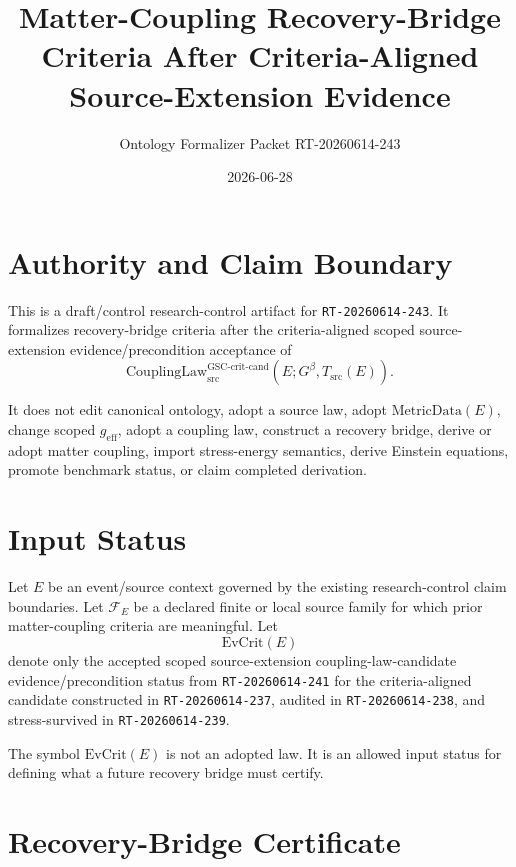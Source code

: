 \documentclass[11pt]{article}
\title{Matter-Coupling Recovery-Bridge Criteria After Criteria-Aligned Source-Extension Evidence}
\author{Ontology Formalizer Packet RT-20260614-243}
\date{2026-06-28}
\newcommand{\Gbeta}{G^{\beta}}
\newcommand{\CouplingLaw}{\mathrm{CouplingLaw}_{\mathrm{src}}^{\mathrm{GSC\mbox{-}crit\mbox{-}cand}}}
\newcommand{\MetricData}{\mathrm{MetricData}}
\newcommand{\geff}{g_{\mathrm{eff}}}
\newcommand{\EvCrit}{\mathrm{EvCrit}}
\begin{document}
\maketitle

\section{Authority and Claim Boundary}

This is a draft/control research-control artifact for
\texttt{RT-20260614-243}. It formalizes recovery-bridge criteria after the
criteria-aligned scoped source-extension evidence/precondition acceptance of
\[
  \CouplingLaw(E;\Gbeta,T_{\mathrm{src}}(E)).
\]

It does not edit canonical ontology, adopt a source law, adopt
\(\MetricData(E)\), change scoped \(\geff\), adopt a coupling law, construct a
recovery bridge, derive or adopt matter coupling, import stress-energy
semantics, derive Einstein equations, promote benchmark status, or claim
completed derivation.

\section{Input Status}

Let \(E\) be an event/source context governed by the existing research-control
claim boundaries. Let \(\mathcal{F}_E\) be a declared finite or local source
family for which prior matter-coupling criteria are meaningful. Let
\[
  \EvCrit(E)
\]
denote only the accepted scoped source-extension coupling-law-candidate
evidence/precondition status from \texttt{RT-20260614-241} for the
criteria-aligned candidate constructed in \texttt{RT-20260614-237}, audited in
\texttt{RT-20260614-238}, and stress-survived in \texttt{RT-20260614-239}.

The symbol \(\EvCrit(E)\) is not an adopted law. It is an allowed input status
for defining what a future recovery bridge must certify.

\section{Recovery-Bridge Certificate}
\end{document}
